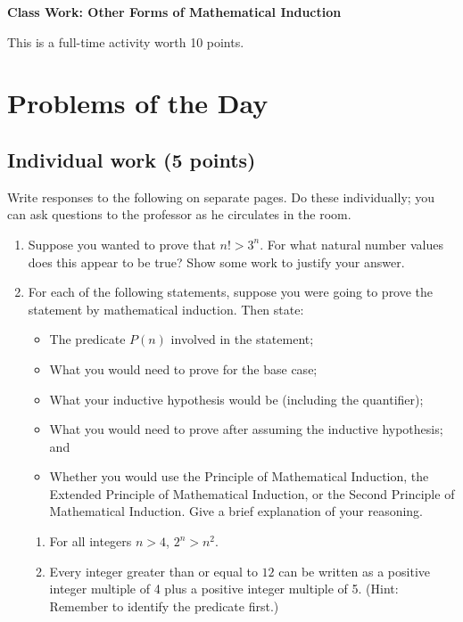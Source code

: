 \documentclass[11pt]{article}
\begin{document}
	
	\thispagestyle{empty}
	\renewcommand{\headrulewidth}{0.0pt}
	\thispagestyle{fancy}
	\lfoot{}
	\cfoot{}
	\rfoot{}	
	
	\vspace*{0in}

		\begin{center}
			\begin{large}
			\textbf{Class Work: Other Forms of Mathematical Induction} \\
			\end{large}
			This is a full-time activity worth 10 points. 
			
		\end{center}
		

\section*{Problems of the Day}

\subsection*{Individual work (5 points)}

Write responses to the following on separate pages. Do these individually; you can ask questions to the professor as he circulates in the room. 

\begin{enumerate}
	\item Suppose you wanted to prove that $n! > 3^n$. For what natural number values does this appear to be true? Show some work to justify your answer. 
	
	\item For each of the following statements, suppose you were going to prove the statement by mathematical induction. Then state: 
	\begin{itemize}
		\item The predicate $P(n)$ involved in the statement; 
		\item What you would need to prove for the base case; 
		\item What your inductive hypothesis would be (including the quantifier);
		\item What you would need to prove after assuming the inductive hypothesis; and 
		\item Whether you would use the Principle of Mathematical Induction, the Extended Principle of Mathematical Induction, or the Second Principle of Mathematical Induction. Give a brief explanation of your reasoning. 
	\end{itemize}
	\begin{enumerate}
		\item For all integers $n > 4$, $2^n > n^2$. 
		\item Every integer greater than or equal to $12$ can be written as a positive integer multiple of 4 plus a positive integer multiple of 5. (Hint: Remember to identify the predicate first.)
	\end{enumerate}
	
\end{enumerate}
\end{document}
